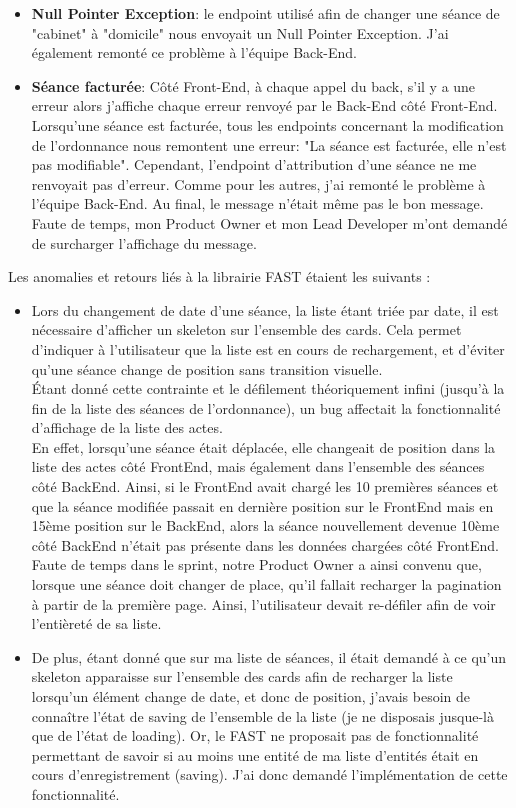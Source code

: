 \documentclass{article}
\begin{document}
\begin{itemize}
    \item \textbf{Null Pointer Exception}: le endpoint utilisé afin de changer une séance de "cabinet" à "domicile" nous envoyait un Null Pointer Exception. J'ai également remonté ce problème à l'équipe Back-End.

    \item \textbf{Séance facturée}: Côté Front-End, à chaque appel du back, s'il y a une erreur alors j'affiche chaque erreur renvoyé par le Back-End côté Front-End. Lorsqu'une séance est facturée, tous les endpoints concernant la modification de l'ordonnance nous remontent une erreur: "La séance est facturée, elle n'est pas modifiable". Cependant, l'endpoint d'attribution d'une séance ne me renvoyait pas d'erreur. Comme pour les autres, j'ai remonté le problème à l'équipe Back-End. Au final, le message n'était même pas le bon message. Faute de temps, mon Product Owner et mon Lead Developer m'ont demandé de surcharger l'affichage du message.

\end{itemize}

Les anomalies et retours liés à la librairie FAST étaient les suivants :

\begin{itemize}
    \item Lors du changement de date d'une séance, la liste étant triée par date, il est nécessaire d'afficher un skeleton sur l'ensemble des cards. Cela permet d'indiquer à l'utilisateur que la liste est en cours de rechargement, et d'éviter qu'une séance change de position sans transition visuelle. \\
    Étant donné cette contrainte et le défilement théoriquement infini (jusqu'à la fin de la liste des séances de l'ordonnance), un bug affectait la fonctionnalité d'affichage de la liste des actes. \\
    En effet, lorsqu'une séance était déplacée, elle changeait de position dans la liste des actes côté FrontEnd, mais également dans l'ensemble des séances côté BackEnd. Ainsi, si le FrontEnd avait chargé les 10 premières séances et que la séance modifiée passait en dernière position sur le FrontEnd mais en 15ème position sur le BackEnd, alors la séance nouvellement devenue 10ème côté BackEnd n'était pas présente dans les données chargées côté FrontEnd. \\
    Faute de temps dans le sprint, notre Product Owner a ainsi convenu que, lorsque une séance doit changer de place, qu'il fallait recharger la pagination à partir de la première page. Ainsi, l'utilisateur devait re-défiler afin de voir l'entièreté de sa liste.
    \item De plus, étant donné que sur ma liste de séances, il était demandé à ce qu'un skeleton apparaisse sur l'ensemble des cards afin de recharger la liste lorsqu'un élément change de date, et donc de position, j'avais besoin de connaître l'état de saving de l'ensemble de la liste (je ne disposais jusque-là que de l'état de loading).
    Or, le FAST ne proposait pas de fonctionnalité permettant de savoir si au moins une entité de ma liste d'entités était en cours d'enregistrement (saving). J'ai donc demandé l'implémentation de cette fonctionnalité.
\end{itemize}
\end{document}
